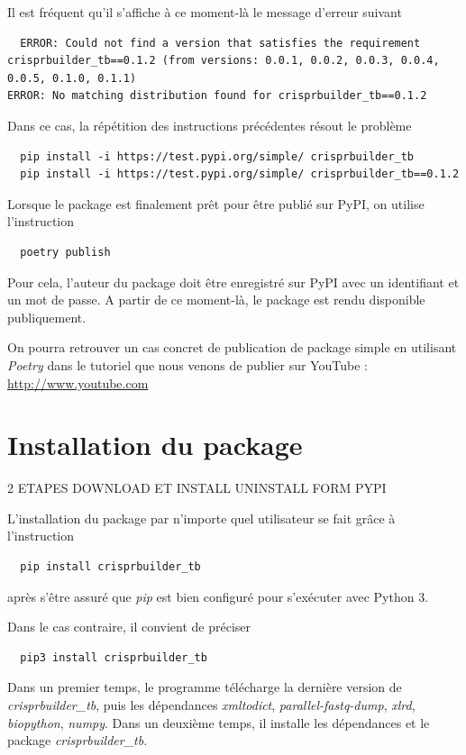 \documentclass[twoside,a4paper,11pt,frenchb,openany]{report}
\begin{document}
Il est fréquent qu'il s'affiche à ce moment-là le message d'erreur suivant

\begin{verbatim}  ERROR: Could not find a version that satisfies the requirement crisprbuilder_tb==0.1.2 (from versions: 0.0.1, 0.0.2, 0.0.3, 0.0.4, 0.0.5, 0.1.0, 0.1.1)
ERROR: No matching distribution found for crisprbuilder_tb==0.1.2\end{verbatim}

Dans ce cas, la répétition des instructions précédentes résout le problème
\begin{verbatim}  pip install -i https://test.pypi.org/simple/ crisprbuilder_tb
  pip install -i https://test.pypi.org/simple/ crisprbuilder_tb==0.1.2\end{verbatim} 

Lorsque le package est finalement prêt pour être publié sur PyPI, on utilise l’instruction
\begin{verbatim}  poetry publish\end{verbatim}
Pour cela, l'auteur du package doit être enregistré sur PyPI avec un identifiant et un mot de passe. A partir de ce moment-là, le package est rendu disponible publiquement.

On pourra retrouver un cas concret de publication de package simple en utilisant \textit{Poetry} dans le tutoriel que nous venons de publier sur YouTube : \href{http://www.youtube.com}{http://www.youtube.com}




\section{Installation du package}

2 ETAPES DOWNLOAD ET INSTALL
UNINSTALL FORM PYPI

L’installation du package par n'importe quel utilisateur se fait grâce à l’instruction
\begin{verbatim}  pip install crisprbuilder_tb\end{verbatim}
après s'être assuré que \textit{pip} est bien configuré pour s'exécuter avec Python 3.

Dans le cas contraire, il convient de préciser
\begin{verbatim}  pip3 install crisprbuilder_tb\end{verbatim}

Dans un premier temps, le programme télécharge la dernière version de \textit{crisprbuilder\_tb}, puis les dépendances \textit{xmltodict}, \textit{parallel-fastq-dump}, \textit{xlrd}, \textit{biopython}, \textit{numpy}. Dans un deuxième temps, il installe les dépendances et le package \textit{crisprbuilder\_tb}.
\end{document}
